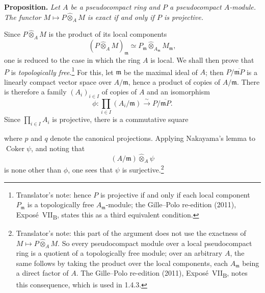 \medskip
\noindent\textbf{Proposition.}
\label{sga3:VIIB:0.3.7-proposition}
\textit{Let \(A\) be a pseudocompact ring and \(P\) a pseudocompact
\(A\)-module. The functor \(M\mapsto P\widehat{\otimes}_A M\) is exact
if and only if \(P\) is projective.}

Since \(P\widehat{\otimes}_A M\) is the product of its local components
\[
  (P\widehat{\otimes}_A M)_{\mathfrak m}
  \simeq
  P_{\mathfrak m}
    \widehat{\otimes}_{A_{\mathfrak m}}M_{\mathfrak m},
\]
one is reduced to the case in which the ring \(A\) is local. We shall
then prove that \(P\) is \emph{topologically free}.\footnote{Translator's note: hence \(P\) is projective
if and only if each local component \(P_{\mathfrak m}\) is a topologically free
\(A_{\mathfrak m}\)-module; the Gille--Polo re-edition (2011), Expos\'e~VII\textsubscript{B}, states this
as a third equivalent condition.} For this, let \(\mathfrak m\) be the
maximal ideal of \(A\); then \(P/\overline{\mathfrak mP}\) is a linearly
compact vector space over \(A/\mathfrak m\), hence a product of copies
of \(A/\mathfrak m\). There is therefore a family \((A_i)_{i\in I}\) of
copies of \(A\) and an isomorphism
\[
  \phi:
  \prod_{i\in I}(A_i/\mathfrak m)
  \xrightarrow{\sim}
  P/\overline{\mathfrak mP}.
\]
Since \(\prod_{i\in I}A_i\) is projective, there is a commutative
square
\begin{center}
  \label{sga3:VIIB:0.3.7-projective-lift-square}
  
\end{center}
where \(p\) and \(q\) denote the canonical projections. Applying
Nakayama's lemma to \(\operatorname{Coker}\psi\), and noting that
\[
  (A/\mathfrak m)\widehat{\otimes}_A\psi
\]
is none other than \(\phi\), one sees that \(\psi\) is
surjective.\footnote{Translator's note: this part of the argument does not use the exactness of
\(M\mapsto P\widehat\otimes_AM\). So every pseudocompact module over a local pseudocompact ring is a
quotient of a topologically free module; over an arbitrary \(A\), the same follows by taking the product
over the local components, each \(A_{\mathfrak m}\) being a direct factor of \(A\). The Gille--Polo
re-edition (2011), Expos\'e~VII\textsubscript{B}, notes this consequence, which is used in 1.4.3.}

